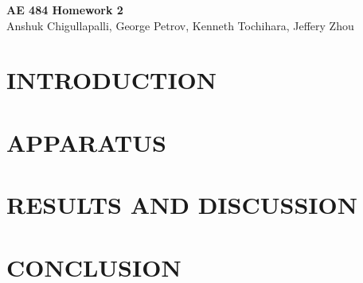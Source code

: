 




\begin{center}
    {\Large\textbf{AE 484 Homework 2}}\\
    Anshuk Chigullapalli, George Petrov, Kenneth Tochihara, Jeffery Zhou\\

\end{center}


\section{INTRODUCTION} \label{sec:introduction}
\section{APPARATUS} \label{sec:apparatus}
\section{RESULTS AND DISCUSSION} \label{sec:results}
\section{CONCLUSION} \label{sec:conclusion}



